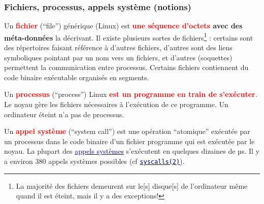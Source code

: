 \documentclass[lualatex,11pt,a4paper,svgnames,french]{beamer}
\begin{document}
\begin{frame}\frametitle{Fichiers, processus, appels système (notions)}

  \begin{relsize}{-0.5}
Un \textbf{\textcolor{red}{fichier}} (``file'') générique (Linux) est
\textbf{\textcolor{red}{une séquence d'octets} avec des méta-données}
la décrivant. Il existe plusieurs sortes de fichiers\footnote{La
majorité des fichiers demeurent sur le[s] disque[s] de l'ordinateur
même quand il est éteint, mais il y a des exceptions!} : certains sont
des répertoires faisant référence à d'autres fichiers, d'autres sont
des liens symboliques pointant par un nom vers un fichiers, et
d'autres (soquettes) permettent la communication entre
processus. Certains fichiers contiennent du code binaire exécutable
organisés en segments.

\medskip

Un \textbf{\textcolor{red}{processus}} (``process'') Linux
\textbf{\textcolor{red}{est un programme en train de s'exécuter}}. Le
noyau gère les fichiers nécessaires à l'exécution de ce programme. Un
ordinateur éteint n'a pas de processus.

\medskip

Un \textbf{\textcolor{red}{appel système}} (``system call'') est une
opération ``atomique'' exécutée par un processus dans le code binaire
d'un fichier programme qui est exécutée par le noyau. La plupart des
\href{https://fr.wikipedia.org/wiki/Appel_système}{\textcolor{Navy}{appels
    systèmes}} s'exécutent en quelques dizaines de µs. Il y a environ
380 appels systèmes possibles (cf \href{https://man7.org/linux/man-pages/man2/syscalls.2.html}{\textcolor{Navy}{\texttt{syscalls(2)}}}).
\smallskip
  \end{relsize}
\end{frame}
\end{document}
